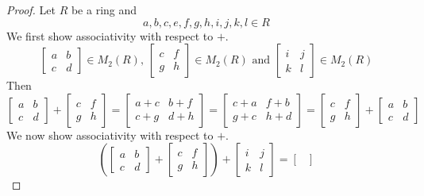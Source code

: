 \begin{proof}
    Let $R$ be a ring and 
    \[a, b, c, e, f, g, h, i, j, k, l \in R\]
    We first show associativity with respect to $+$.
    \[\begin{bmatrix}
        a & b \\
        c & d
    \end{bmatrix} \in M_2(R) \text{, }
    \begin{bmatrix}
        c & f \\
        g & h
    \end{bmatrix} \in M_2(R) \text{ and }
    \begin{bmatrix}
        i & j \\
        k & l
    \end{bmatrix} \in M_2(R)\]
    Then 
    \[\begin{bmatrix}
        a & b \\
        c & d
    \end{bmatrix} + \begin{bmatrix}
        c & f \\
        g & h
    \end{bmatrix} = \begin{bmatrix}
        a+c & b+f \\
        c+g & d+h
    \end{bmatrix} = \begin{bmatrix}
        c+a & f+b \\
        g+c & h+d
    \end{bmatrix} = \begin{bmatrix}
        c & f \\
        g & h
    \end{bmatrix} + \begin{bmatrix}
        a & b \\
        c & d
    \end{bmatrix}\]
    We now show associativity with respect to $+$.
\[\left(\begin{bmatrix}
        a & b \\
        c & d
    \end{bmatrix} + \begin{bmatrix}
        c & f \\
        g & h
    \end{bmatrix}\right) + \begin{bmatrix}
        i & j \\
        k & l
    \end{bmatrix} = \begin{bmatrix}

\end{bmatrix}\]
\end{proof}
